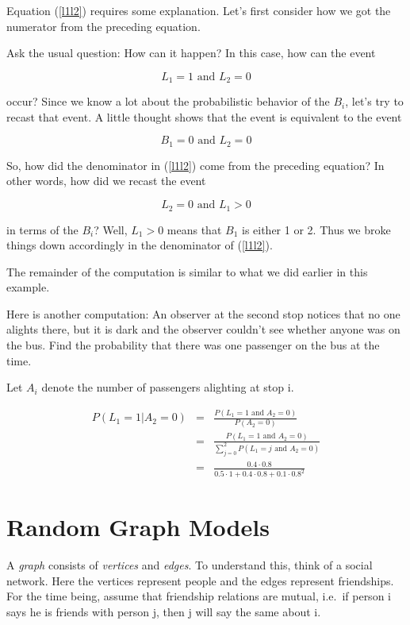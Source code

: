 Equation (\ref{l1l2}) requires some explanation.  Let's first consider
how we got the numerator from the preceding equation.

Ask the usual question:  How can it happen?  In this case, how can the
event 

\begin{equation}
L_1 = 1 \textrm{ and } L_2 = 0
\end{equation}

occur?  Since we know a lot about
the probabilistic behavior of the $B_i$, let's try to recast that event.
A little thought shows that the event is equivalent to the event 

\begin{equation}
B_1 = 0 \textrm{ and } L_2 = 0
\end{equation}

So, how did the denominator in (\ref{l1l2}) come from the preceding
equation?  In other words, how did we recast the event 

\begin{equation}
L_2 = 0 \textrm{ and } L_1 > 0
\end{equation}

in terms of the $B_i$?  Well, $L_1 > 0$ means that $B_1$ is either 1 or
2.  Thus we broke things down accordingly in the denominator of
(\ref{l1l2}).  

The remainder of the computation is similar to what we did earlier in
this example.

Here is another computation:  An observer at the second stop notices
that no one alights there, but it is dark and the observer couldn't see
whether anyone was on the bus. Find the probability that there was one
passenger on the bus at the time.

Let $A_i$ denote the number of passengers alighting at stop i.

\begin{eqnarray}
P(L_1 = 1 | A_2 = 0)
&=& \frac
{P(L_1 = 1 \textrm{ and } A_2 = 0)}
{P(A_2 = 0)} \\ 
&=& \frac
{P(L_1 = 1 \textrm{ and } A_2 = 0)}
{\sum_{j=0}^2
P(L_1 = j \textrm{ and } A_2 = 0)} \\
&=& 
\frac
{0.4 \cdot 0.8}
{0.5 \cdot 1 + 0.4 \cdot 0.8 + 0.1 \cdot 0.8^2}
\end{eqnarray}

\section{Random Graph Models}
\label{randomgraph}
A {\it graph} consists of {\it vertices} and {\it edges}.  To understand
this, think of a social network.  Here the vertices represent people and
the edges represent friendships.  For the time being, assume that
friendship relations are mutual, i.e.\ if person i says he is friends
with person j, then j will say the same about i.

